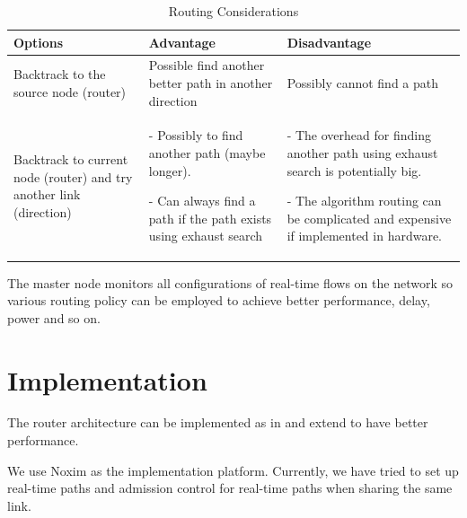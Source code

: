 \documentclass[a4]{article}
\begin{document}
\begin{table}[h]
\begin{center}
  \begin{tabular}{ | p{3cm} | p{4cm} | p{4cm} |}
    \hline
	Options & Advantage & Disadvantage \\ \hline
	Backtrack to the source node (router) & 
	Possible find another better path in another direction &
	Possibly cannot find a path \\ \hline
	Backtrack to current node (router) and try another link (direction) &
	- Possibly to find another path (maybe longer).  

	- Can always find a path if the path exists using exhaust search	&
	- The overhead for finding another path using exhaust search is potentially  big.

	- The algorithm routing can be complicated and expensive if implemented in hardware. \\
    \hline
  \end{tabular}
\end{center}
\caption{Routing Considerations}
\label{table:RoutingConsiderations}
\end{table}

The master node monitors all configurations of real-time flows on the network
so various routing policy can be employed to achieve better performance, delay,
power and so on.

\section{Implementation}
The router architecture can be implemented as in \cite{Rexford98arouter, Zhang_1service} 
and extend \cite{PehDelayModel, PehSpecPipeR} to have better performance.

We use Noxim \cite{Noxim} as the implementation platform. Currently, we have tried
to set up real-time paths and admission control for real-time paths when sharing 
the same link.




\end{document}
